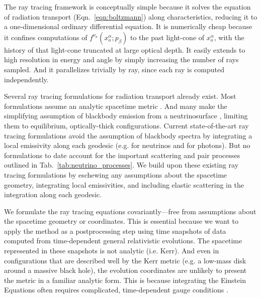 \documentclass[aps,floatfix,prd,superscriptaddress,twocolumn]{revtex4-1}
\begin{document}
The ray tracing framework
is conceptually simple because it solves the equation of radiation
transport (Eqn.~\ref{eqn:boltzmann}) along characteristics,
reducing it to a one-dimensional ordinary differential equation.
It is numerically cheap because it confines computations of
$f^{\nu_\sigma}(x_o^\alpha;p_\beta)$ to the past light-cone of $x_o^\alpha$,
with the history of that light-cone truncated at large optical depth.
It easily extends to high resolution in energy and angle by simply
increasing the number of rays sampled.
And it parallelizes trivially by ray, since each ray is computed
independently.

Several ray tracing formulations for radiation transport already exist.
Most formulations assume an analytic spacetime metric
\citep{birk2007-nunubar, caba2009-detecting_grb_nu,
  hari2010-gr_nunubar_collapsar, kova2011-gr_ray_tracing}.
And many make the simplifying assumption of blackbody emission from a
neutrinosurface
\citep{birk2007-nunubar, caba2009-detecting_grb_nu, kova2011-gr_ray_tracing},
limiting them to equilibrium, optically-thick configurations.
Current state-of-the-art ray tracing formulations avoid the assumption of
blackbody spectra by integrating a local emissivity along each geodesic
(e.g. \cite{hari2010-gr_nunubar_collapsar} for neutrinos and
\cite{youn2012-gr_radiative_transfer} for photons).
But no formulations to date account for the important scattering and pair
processes outlined in Tab.~\ref{tab:neutrino_processes}.
We build upon these existing ray tracing formulations
by eschewing any assumptions about the spacetime geometry,
integrating local emissivities,
and including elastic scattering in the integration along each geodesic.

We formulate the ray tracing equations covariantly---free from
assumptions about the spacetime geometry or coordinates. This is essential
because we want to apply the method as a postprocessing step using
time snapshots of data computed from time-dependent general relativistic evolutions.
The spacetime represented in these snapshots is not analytic (i.e. Kerr).
And even in configurations that are described well by the Kerr metric
(e.g. a low-mass disk around a massive black hole),
the evolution coordinates are unlikely to present the metric in
a familiar analytic form.
This is because integrating the Einstein Equations often requires complicated,
time-dependent gauge conditions
\citep{lind2007-gen_harmonic, fouc2013-compactness_and_spin}.
\end{document}
